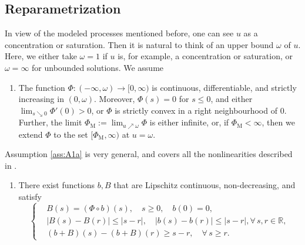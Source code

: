 \documentclass[review,11pt]{article}
\numberwithin{equation}{section}
\def \vs  {\omega}
\def \Maxi {{\mathrm{M}}}
\newtheorem{remark}[remark]{Remark}
\newcounter{Ass}
\begin{document}
\subsection{Reparametrization}\label{subsec:reparametrization}
In view of the modeled processes mentioned before, one can see $u$ as a concentration or saturation. Then it is natural to think of an upper bound $\omega$ of $u$. Here, we either take $\omega = 1$ if $u$ is, for example, a concentration or saturation, or $\omega = \infty$ for unbounded solutions. We assume
\begin{enumerate}[label=(A.1\alph*)]
\item \label{ass:A1a}
The function $\Phi:(-\infty,\vs) \to [0,\infty)$ is continuous, differentiable, and strictly increasing in $(0,\vs)$. 
Moreover, $\Phi(s)=0$ for $s\leq 0$, and either $\lim_{s\searrow 0}\Phi'(0)>0$, or $\Phi$ is strictly convex in a right neighbourhood of 0. Further, the limit $\Phi_\Maxi:=\lim_{u\nearrow \vs}\Phi$ is either infinite, or, if $\Phi_\Maxi<\infty$, then we extend $\Phi$ to the set $[\Phi_\Maxi,\infty)$ at $u=\vs$.  
\end{enumerate}

Assumption \ref{ass:A1a} is very general, and covers all the nonlinearities described in .

\begin{enumerate}[label=(A.2\alph*)]
\item \label{ass:A1b}
There exist functions $b, B$  that are Lipschitz continuous, non-decreasing, and satisfy
\begin{equation}\label{eq:conditionbB1}
\left\{
\begin{aligned}
&B(s) = (\Phi \circ b)(s), \quad s \ge 0, \quad b(0)=0,\\
&|B(s) - B(r)| \le |s - r|, \quad |b(s) - b(r)| \le |s - r|, \forall\, s,r \in \mathbb{R},\\
&(b+B)(s) - (b+B)(r) \ge s - r, \quad \forall\, s \ge r .
\end{aligned}
\right.
\end{equation}
\end{enumerate}
\end{document}
